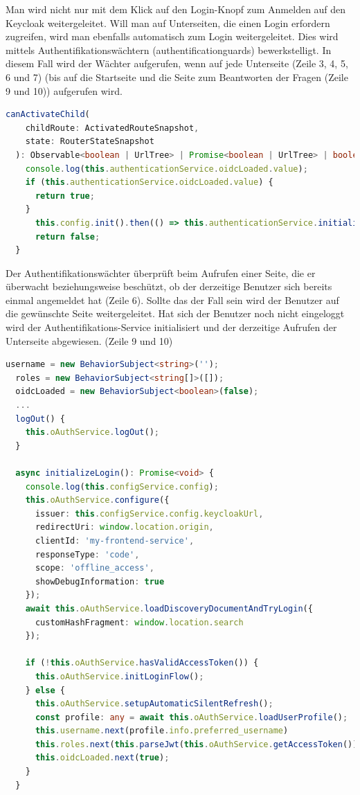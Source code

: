 Man wird nicht nur mit dem Klick auf den Login-Knopf zum Anmelden auf den Keycloak weitergeleitet. Will man auf 
Unterseiten, die einen Login erfordern zugreifen, wird man ebenfalls automatisch zum Login weitergeleitet. Dies wird mittels 
Authentifikationswächtern (authentificationguards) bewerkstelligt. In diesem Fall wird der Wächter aufgerufen, wenn auf 
jede Unterseite (Zeile 3, 4, 5, 6 und 7) (bis auf die Startseite und die Seite zum Beantworten der Fragen (Zeile 9 und 10)) aufgerufen wird.
\newline
\newline
\begin{lstlisting}[language=TypeScript, caption=Authentifikationswächter, label=lst:Authentifikationswächter]
  canActivateChild(
    childRoute: ActivatedRouteSnapshot,
    state: RouterStateSnapshot
  ): Observable<boolean | UrlTree> | Promise<boolean | UrlTree> | boolean | UrlTree {
    console.log(this.authenticationService.oidcLoaded.value);
    if (this.authenticationService.oidcLoaded.value) {
      return true;
    }
      this.config.init().then(() => this.authenticationService.initializeLogin())
      return false;
  }
\end{lstlisting}
Der Authentifikationswächter überprüft beim Aufrufen einer Seite, die er überwacht beziehungsweise beschützt, ob der 
derzeitige Benutzer sich bereits einmal angemeldet hat (Zeile 6). Sollte das der Fall sein wird der Benutzer auf die gewünschte Seite weitergeleitet. 
Hat sich der Benutzer noch nicht eingeloggt wird der Authentifikations-Service initialisiert und der derzeitige Aufrufen der Unterseite abgewiesen. (Zeile 9 und 10) 
\newline
\newline
\begin{lstlisting}[language=TypeScript, caption=Login und Logout, label=lst:Login und Logout]
  username = new BehaviorSubject<string>('');
  roles = new BehaviorSubject<string[]>([]);
  oidcLoaded = new BehaviorSubject<boolean>(false);
  ...
  logOut() {
    this.oAuthService.logOut();
  }
  
  async initializeLogin(): Promise<void> {
    console.log(this.configService.config);
    this.oAuthService.configure({
      issuer: this.configService.config.keycloakUrl,
      redirectUri: window.location.origin,
      clientId: 'my-frontend-service',
      responseType: 'code',
      scope: 'offline_access',
      showDebugInformation: true
    });
    await this.oAuthService.loadDiscoveryDocumentAndTryLogin({
      customHashFragment: window.location.search
    });
  
    if (!this.oAuthService.hasValidAccessToken()) {
      this.oAuthService.initLoginFlow();
    } else {
      this.oAuthService.setupAutomaticSilentRefresh();
      const profile: any = await this.oAuthService.loadUserProfile();
      this.username.next(profile.info.preferred_username)
      this.roles.next(this.parseJwt(this.oAuthService.getAccessToken()).realm_access.roles);
      this.oidcLoaded.next(true);
    }
  }
\end{lstlisting}

